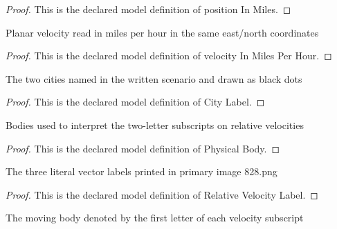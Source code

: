 \begin{proof}
  This is the declared model definition of position In Miles.
\end{proof}
\begin{definition}
  \label{def:physics:phyx-mini-0828:phyxminiproblems-problemphyxmini0828-velocityinmilesperhour}
  Planar velocity read in miles per hour in the same east/north coordinates
\end{definition}
\begin{proof}
  This is the declared model definition of velocity In Miles Per Hour.
\end{proof}
\begin{definition}
  \label{def:physics:phyx-mini-0828:phyxminiproblems-problemphyxmini0828-citylabel}
  The two cities named in the written scenario and drawn as black dots
\end{definition}
\begin{proof}
  This is the declared model definition of City Label.
\end{proof}
\begin{definition}
  \label{def:physics:phyx-mini-0828:phyxminiproblems-problemphyxmini0828-physicalbody}
  Bodies used to interpret the two-letter subscripts on relative velocities
\end{definition}
\begin{proof}
  This is the declared model definition of Physical Body.
\end{proof}
\begin{definition}
  \label{def:physics:phyx-mini-0828:phyxminiproblems-problemphyxmini0828-relativevelocitylabel}
  The three literal vector labels printed in primary image 828.png
\end{definition}
\begin{proof}
  This is the declared model definition of Relative Velocity Label.
\end{proof}
\begin{definition}
  \label{def:physics:phyx-mini-0828:phyxminiproblems-problemphyxmini0828-movingbody}
  The moving body denoted by the first letter of each velocity subscript
\end{definition}
